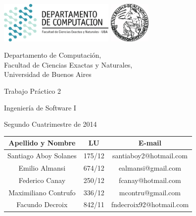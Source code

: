 \documentclass[a4paper, 10pt, twoside]{article}
\begin{document}


\thispagestyle{caratula}

\begin{center}

\includegraphics[height=2cm]{DC.png} 
\hfill
\includegraphics[height=2cm]{UBA.jpg} 

\vspace{2cm}

Departamento de Computación,\\
Facultad de Ciencias Exactas y Naturales,\\
Universidad de Buenos Aires

\vspace{4cm}

\begin{Huge}
Trabajo Práctico 2
\end{Huge}

\vspace{0.5cm}

\begin{Large}
Ingeniería de Software I
\end{Large}

\vspace{1cm}

Segundo Cuatrimestre de 2014

\vspace{4cm}

\begin{tabular}{|c|c|c|}
\hline
Apellido y Nombre & LU & E-mail\\
\hline
Santiago Aboy Solanes & 175/12 & santiaboy2@hotmail.com \\
Emilio Almansi & 674/12 & ealmansi@gmail.com \\
Federico Canay & 250/12 & fcanay@hotmail.com \\
Maximiliano Contrufo & 336/12 & mcontru@gmail.com  \\
Facundo Decroix & 842/11 & fndecroix92@hotmail.com \\
\hline
\end{tabular}

\end{center}
\end{document}

